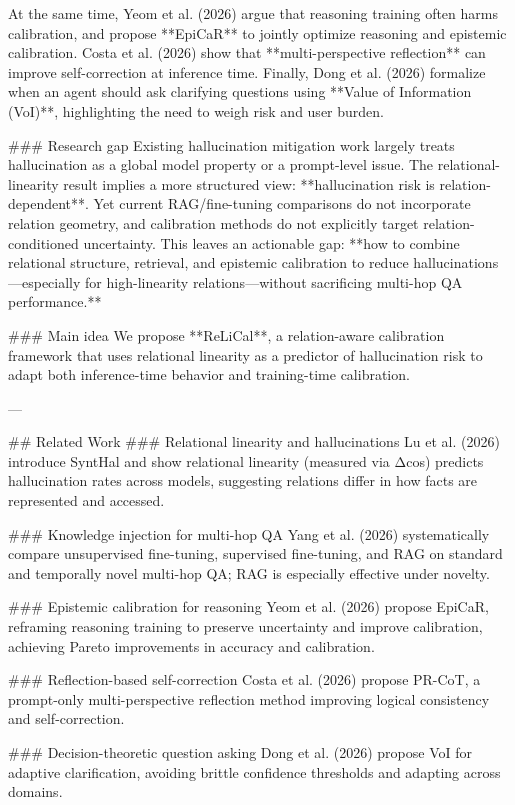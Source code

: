 At the same time, Yeom et al. (2026) argue that reasoning training often harms calibration, and propose **EpiCaR** to jointly optimize reasoning and epistemic calibration. Costa et al. (2026) show that **multi-perspective reflection** can improve self-correction at inference time. Finally, Dong et al. (2026) formalize when an agent should ask clarifying questions using **Value of Information (VoI)**, highlighting the need to weigh risk and user burden.

### Research gap  
Existing hallucination mitigation work largely treats hallucination as a global model property or a prompt-level issue. The relational-linearity result implies a more structured view: **hallucination risk is relation-dependent**. Yet current RAG/fine-tuning comparisons do not incorporate relation geometry, and calibration methods do not explicitly target relation-conditioned uncertainty. This leaves an actionable gap: **how to combine relational structure, retrieval, and epistemic calibration to reduce hallucinations—especially for high-linearity relations—without sacrificing multi-hop QA performance.**

### Main idea  
We propose **ReLiCal**, a relation-aware calibration framework that uses relational linearity as a predictor of hallucination risk to adapt both inference-time behavior and training-time calibration.

---

## Related Work  
### Relational linearity and hallucinations  
Lu et al. (2026) introduce SyntHal and show relational linearity (measured via Δcos) predicts hallucination rates across models, suggesting relations differ in how facts are represented and accessed.

### Knowledge injection for multi-hop QA  
Yang et al. (2026) systematically compare unsupervised fine-tuning, supervised fine-tuning, and RAG on standard and temporally novel multi-hop QA; RAG is especially effective under novelty.

### Epistemic calibration for reasoning  
Yeom et al. (2026) propose EpiCaR, reframing reasoning training to preserve uncertainty and improve calibration, achieving Pareto improvements in accuracy and calibration.

### Reflection-based self-correction  
Costa et al. (2026) propose PR-CoT, a prompt-only multi-perspective reflection method improving logical consistency and self-correction.

### Decision-theoretic question asking  
Dong et al. (2026) propose VoI for adaptive clarification, avoiding brittle confidence thresholds and adapting across domains.

